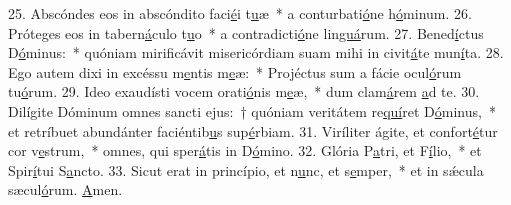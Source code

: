 25. Abscóndes eos in abscóndito faci\uline{é}i t\uline{u}æ~* a conturbati\uline{ó}ne h\uline{ó}minum.
26. Próteges eos in tabern\uline{á}culo t\uline{u}o~* a contradicti\uline{ó}ne lin\uline{guá}rum.
27. Bened\uline{í}ctus D\uline{ó}minus:~* quóniam mirificávit misericórdiam suam mihi in civit\uline{á}te mun\uline{í}ta.
28. Ego autem dixi in excéssu m\uline{e}ntis m\uline{e}æ:~* Projéctus sum a fácie ocul\uline{ó}rum tu\uline{ó}rum.
29. Ideo exaudísti vocem orati\uline{ó}nis m\uline{e}æ,~* dum clam\uline{á}rem \uline{a}d te.
30. Dilígite Dóminum omnes sancti ejus:~† quóniam veritátem re\uline{quí}ret D\uline{ó}minus,~* et retríbuet abundánter faciéntib\uline{u}s sup\uline{é}rbiam.
31. Viríliter ágite, et confort\uline{é}tur cor v\uline{e}strum,~* omnes, qui sper\uline{á}tis in D\uline{ó}mino.
32. Glória P\uline{a}tri, et F\uline{í}lio,~* et Spir\uline{í}tui S\uline{a}ncto.
33. Sicut erat in princípio, et n\uline{u}nc, et s\uline{e}mper,~* et in sǽcula sæcul\uline{ó}rum. \uline{A}men.
